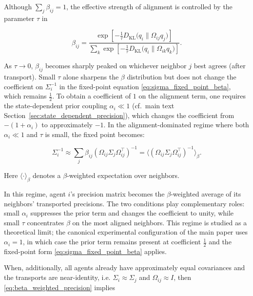 \documentclass[twoside,11pt]{article}
\begin{document}
Although $\sum_j \beta_{ij} = 1$, the effective strength of alignment is controlled by the parameter $\tau$ in

\begin{equation}
\beta_{ij}
=\frac{
\exp \left[
-\frac{1}{\tau}
D_{\mathrm{KL}} \big(q_i \| \Omega_{ij} q_j\big)
\right]
}{\sum_k
\exp \left[
-\frac{1}{\tau}
D_{\mathrm{KL}} \big(q_i \| \Omega_{ik} q_k\big)
\right]}.
\end{equation}

As $\tau \to 0$, $\beta_{ij}$ becomes sharply peaked on whichever neighbor $j$ best agrees (after transport). Small $\tau$ alone sharpens the $\beta$ distribution but does not change the coefficient on $\Sigma_i^{-1}$ in the fixed-point equation \eqref{eq:sigma_fixed_point_beta}, which remains $\frac{1}{2}$. To obtain a coefficient of $1$ on the alignment term, one requires the state-dependent prior coupling $\alpha_i \ll 1$ (cf.\ main text Section~\ref{sec:state_dependent_precision}), which changes the coefficient from $-(1+\alpha_i)$ to approximately $-1$. In the alignment-dominated regime where both $\alpha_i \ll 1$ and $\tau$ is small, the fixed point becomes:

\begin{equation}
\boxed{
\Sigma_i^{-1}
 \approx 
\sum_j \beta_{ij}
(\Omega_{ij}\Sigma_j\Omega_{ij}^\top)^{-1}
 = \big\langle(\Omega_{ij}\Sigma_j\Omega_{ij}^\top)^{-1}
\big\rangle_{\beta}.}
\label{eq:beta_weighted_precision}
\end{equation}

Here $\langle \cdot \rangle_{\beta}$ denotes a $\beta$-weighted expectation over neighbors.

In this regime, agent $i$'s precision matrix becomes the $\beta$-weighted average of its neighbors' transported precisions. The two conditions play complementary roles: small $\alpha_i$ suppresses the prior term and changes the coefficient to unity, while small $\tau$ concentrates $\beta$ on the most aligned neighbors. This regime is studied as a theoretical limit; the canonical experimental configuration of the main paper uses $\alpha_i = 1$, in which case the prior term remains present at coefficient $\frac{1}{2}$ and the fixed-point form \eqref{eq:sigma_fixed_point_beta} applies.

When, additionally, all agents already have approximately equal covariances and the transports are near-identity, i.e. $\Sigma_i \approx \Sigma_j$ and $\Omega_{ij} \approx I$, then \eqref{eq:beta_weighted_precision} implies
\end{document}
